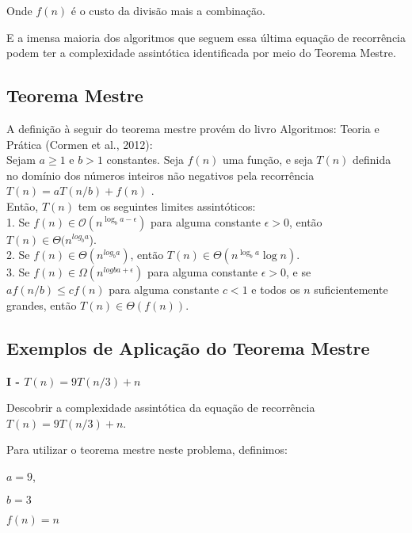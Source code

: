 \documentclass[a4paper, twocolumn]{article}
\theoremstyle{definition}
\begin{document}
	Onde $f(n)$ é o custo da divisão mais a combinação.
	
	E a imensa maioria dos algoritmos que seguem essa última equação de recorrência podem ter a complexidade assintótica identificada por meio do Teorema Mestre.
	
	\subsection{Teorema Mestre}
	
	A definição à seguir do teorema mestre provém do livro Algoritmos: Teoria e Prática (Cormen et al., 2012): \\
	
	Sejam $a \geq 1$ e $b > 1$ constantes. Seja $f(n)$ uma função, e seja $T(n)$ definida  no  domínio dos  números  inteiros  não negativos pela recorrência \\
	
	 $T(n) = aT(n/b) + f(n)$ . \\
		
	Então, $T(n)$ tem os seguintes limites assintóticos: \\
	
	1. Se $f(n) \in \mathcal{O}(n^{\log_b a-\epsilon})$ para alguma constante  $\epsilon> 0$, então $T(n) \in \Theta(n^{log_ba}$). \\
	 
	2. Se $f(n) \in \Theta(n^{log_b a})$, então $T(n) \in \Theta(n^{\log_b a} \log n)$. \\
	
	3. Se $f(n) \in \Omega(n^{logb a+ \epsilon})$ para alguma constante $\epsilon > 0$, e se $af(n/b) \leq cf(n)$ para alguma constante $c < 1$ e todos os $n$ suficientemente grandes, então $T(n) \in \Theta(f(n))$.
	
	\subsection{Exemplos de Aplicação do Teorema Mestre}
	
	\textbf{I - $T(n) = 9T(n/3)+ n$}
		
	Descobrir a complexidade assintótica da equação de recorrência $T(n) = 9T(n/3)+ n$.
	
	Para utilizar o teorema mestre neste problema, definimos:
	
	$a=9$,
	
	$b=3$
	
	$f(n) = n$ \\
	
\end{document}
